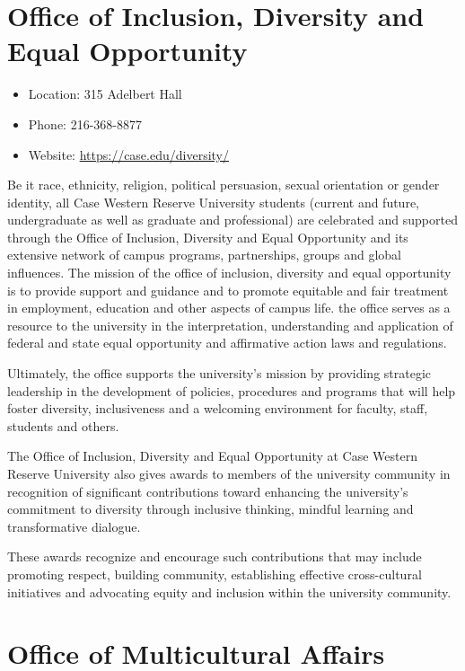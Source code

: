 \documentclass[
]{book}
\providecommand{\tightlist}{%
  \setlength{\itemsep}{0pt}\setlength{\parskip}{0pt}}
\begin{document}
\hypertarget{office-of-inclusion-diversity-and-equal-opportunity}{%
\section{Office of Inclusion, Diversity and Equal Opportunity}\label{office-of-inclusion-diversity-and-equal-opportunity}}

\begin{itemize}
\tightlist
\item
  Location: 315 Adelbert Hall
\item
  Phone: 216-368-8877
\item
  Website: \url{https://case.edu/diversity/}
\end{itemize}

Be it race, ethnicity, religion, political persuasion, sexual orientation or gender identity, all Case Western Reserve University students (current and future, undergraduate as well as graduate and professional) are celebrated and supported through the Office of Inclusion, Diversity and Equal Opportunity and its extensive network of campus programs, partnerships, groups and global influences. The mission of the office of inclusion, diversity and equal opportunity is to provide support and guidance and to promote equitable and fair treatment in employment, education and other aspects of campus life. the office serves as a resource to the university in the interpretation, understanding and application of federal and state equal opportunity and affirmative action laws and regulations.

Ultimately, the office supports the university's mission by providing strategic leadership in the development of policies, procedures and programs that will help foster diversity, inclusiveness and a welcoming environment for faculty, staff, students and others.

The Office of Inclusion, Diversity and Equal Opportunity at Case Western Reserve University also gives awards to members of the university community in recognition of significant contributions toward enhancing the university's commitment to diversity through inclusive thinking, mindful learning and transformative dialogue.

These awards recognize and encourage such contributions that may include promoting respect, building community, establishing effective cross-cultural initiatives and advocating equity and inclusion within the university community.

\hypertarget{office-of-multicultural-affairs}{%
\section{Office of Multicultural Affairs}\label{office-of-multicultural-affairs}}
\end{document}
